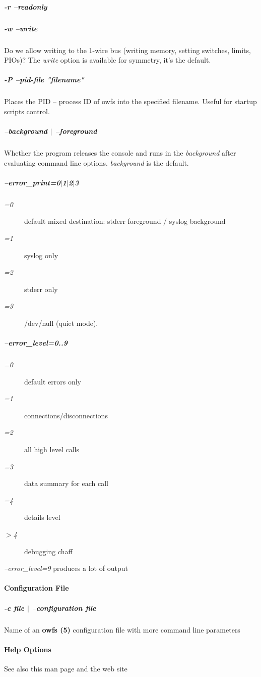 \subparagraph*{-r --readonly}
\subparagraph*{-w --write}Do we allow writing to the 1-wire bus (writing memory,
setting switches, limits, PIOs)? The \textit{write} option is available for symmetry,
it's the default. 
\subparagraph*{-P --pid-file "filename"}Places the PID -- process ID of owfs
into the specified filename. Useful for startup scripts control. 
\subparagraph*{--background
$|$ --foreground}Whether the program releases the console and runs in the \textit{background}
after evaluating command line options. \textit{background} is the default. 
\subparagraph*{--error\_print=0$|$1$|$2$|$3}\begin{description}
\item [\textit{=0}
] default mixed destination: stderr foreground / syslog background 
\item [\textit{=1} ] syslog
only 
\item [\textit{=2} ] stderr only 
\item [\textit{=3} ] /dev/null (quiet mode). 
\end{description}

\subparagraph*{--error\_level=0..9}\begin{description}
\item [\textit{=0} ] default
errors only 
\item [\textit{=1} ] connections/disconnections 
\item [\textit{=2} ] all high level calls 
\item [\textit{=3} ] data
summary for each call 
\item [\textit{=4} ] details level 
\item [\textit{$>$4} ] debugging chaff 
\end{description}


\textit{--error\_level=9}
produces a lot of output            
\paragraph*{Configuration File}

\subparagraph*{-c file $|$ --configuration
file}Name of an \textsf{\textbf{owfs (5)}} configuration file with more command line parameters
            
\paragraph*{Help Options}
See also this man page and the web site 

